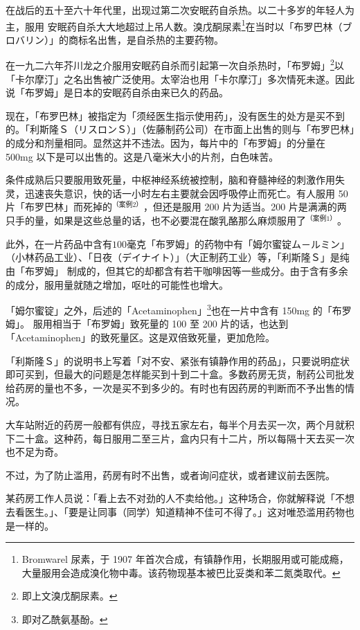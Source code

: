 \documentclass[UTF8]{ctexart}
\begin{document}
在战后的五十至六十年代里，出现过第二次安眠药自杀热。以二十多岁的年轻人为主，服用
安眠药自杀大大地超过上吊人数。溴戊酮尿素\footnote{Bromwarel 尿素，于 1907 年首次合成，有镇静作用，长期服用或可能成瘾，大量服用会造成溴化物中毒。该药物现基本被巴比妥类和苯二氮类取代。}在当时以「布罗巴林（ブロバリン）」的商标名出售，是自杀热的主要药物。

在一九二六年芥川龙之介服用安眠药自杀而引起第一次自杀热时，「布罗姆」\footnote{即上文溴戊酮尿素。}以「卡尔摩汀」之名出售被广泛使用。太宰治也用「卡尔摩汀」多次情死未遂。因此说「布罗姆」是日本的安眠药自杀由来已久的药品。

现在，「布罗巴林」被指定为「须经医生指示使用药」，没有医生的处方是买不到的。「利斯隆Ｓ（リスロンＳ）」（佐藤制药公司）在市面上出售的则与「布罗巴林」的成分和剂量相同。显然这并不违法。因为，每片中的「布罗姆」的分量在 500mg 以下是可以出售的。这是八毫米大小的片剂，白色味苦。

条件成熟后只要服用致死量，中枢神经系统被控制，脑和脊髓神经的刺激作用失灵，迅速丧失意识，快的话一小时左右主要就会因呼吸停止而死亡。有人服用 50 片「布罗巴林」而死掉的$^{（案例2）}$，但还是服用 200 片为适当。200 片是满满的两只手的量，如果是这些总量的话，也不必要混在酸乳酪那么麻烦服用了$^{（案例1）}$。

此外，在一片药品中含有$100$毫克「布罗姆」的药物中有「姆尔蜜锭ム－ルミン」（小林药品工业）、「日夜（デイナイト）」（大正制药工业）等，「利斯隆Ｓ」是纯由「布罗姆」 制成的，但其它的却都含有若干咖啡因等一些成分。由于含有多余的成分，服用量就随之增加，呕吐的可能性也增大。

「姆尔蜜锭」之外，后述的「Acetaminophen」\footnote{即对乙酰氨基酚。}也在一片中含有 150mg 的「布罗姆」。 服用相当于「布罗姆」致死量的 100 至 200 片的话，也达到「Acetaminophen」的致死量区。这是双倍致死量，更加危险。

「利斯隆Ｓ」的说明书上写着「对不安、紧张有镇静作用的药品」，只要说明症状即可买到，但最大的问题是怎样能买到十到二十盒。多数药房无货，制药公司批发给药房的量也不多，一次是买不到多少的。有时也有因药房的判断而不予出售的情况。

大车站附近的药房一般都有供应，寻找五家左右，每半个月去买一次，两个月就积下二十盒。这种药，每日服用二至三片，盒内只有十二片，所以每隔十天去买一次也不足为奇。

不过，为了防止滥用，药房有时不出售，或者询问症状，或者建议前去医院。

某药房工作人员说：「看上去不对劲的人不卖给他。」这种场合，你就解释说「不想去看医生。」、「要是让同事（同学）知道精神不佳可不得了。」这对唯恐滥用药物也是一样的。
\end{document}
